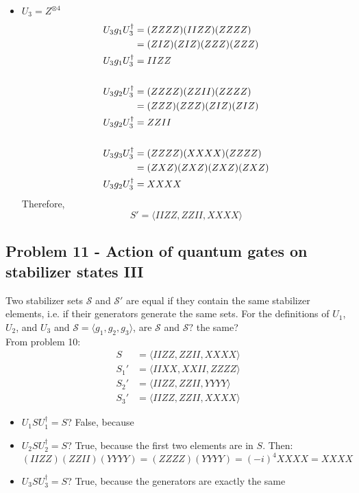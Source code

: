 \begin{itemize}
    \item $U_3 = Z^{\otimes 4}$
    \begin{align}
        U_3g_1U_3^\dagger &= (ZZZZ)(IIZZ)(ZZZZ) \\
        &= (ZIZ)(ZIZ)(ZZZ)(ZZZ) \\
        U_3g_1U_3^\dagger & = IIZZ \\
        &\notag \\
        U_3g_2U_3^\dagger &= (ZZZZ)(ZZII)(ZZZZ) \\
        &= (ZZZ)(ZZZ)(ZIZ)(ZIZ) \\
        U_3g_2U_3^\dagger & = ZZII \\
        &\notag \\
        U_3g_3U_3^\dagger &= (ZZZZ)(XXXX)(ZZZZ) \\
        &= (ZXZ)(ZXZ)(ZXZ)(ZXZ) \\
        U_3g_2U_3^\dagger & = XXXX 
    \end{align}
    Therefore,
    \begin{equation}
        \boxed{S' = \langle IIZZ, ZZII, XXXX \rangle}
    \end{equation}
\end{itemize}



\newpage
\subsection{Problem 11 - Action of quantum gates on stabilizer states III}
Two stabilizer sets $\mathcal{S}$ and $\mathcal{S}'$ are equal if they contain the same stabilizer elements, i.e. if their generators generate the same sets. For the definitions of $U_1$, $U_2$, and $U_3$ and $\mathcal{S} = \langle g_1, g_2, g_3 \rangle$, are $\mathcal{S}$ and $\mathcal{S}?$ the same? \\
From problem 10:
\begin{align}
    S &= \langle IIZZ, ZZII, XXXX \rangle \\
    S_1' & = \langle IIXX, XXII,ZZZZ \rangle \\
    S_2' & = \langle IIZZ, ZZII, YYYY \rangle \\
    S_3' & =  \langle IIZZ, ZZII, XXXX \rangle
\end{align}

\begin{itemize}
    \item $U_1SU_1^\dagger = S$? False, because 
    \item $U_2SU_2^\dagger = S$? True, because the first two elements are in $S$. Then: 
    \begin{equation}
        (IIZZ)(ZZII)(YYYY) = (ZZZZ)(YYYY) = (-i)^4XXXX = XXXX
    \end{equation}
    \item $U_3SU_3^\dagger = S$? True, because the generators are exactly the same
\end{itemize}



